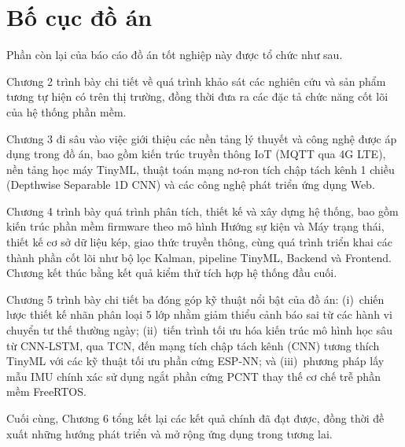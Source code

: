 \documentclass[../DoAn.tex]{subfiles}
\begin{document}
\section{Bố cục đồ án}
\label{section:1.4}
Phần còn lại của báo cáo đồ án tốt nghiệp này được tổ chức như sau.

Chương 2 trình bày chi tiết về quá trình khảo sát các nghiên cứu và sản phẩm tương tự hiện có trên thị trường, đồng thời đưa ra các đặc tả chức năng cốt lõi của hệ thống phần mềm.

Chương 3 đi sâu vào việc giới thiệu các nền tảng lý thuyết và công nghệ được áp dụng trong đồ án, bao gồm kiến trúc truyền thông IoT (MQTT qua 4G LTE), nền tảng học máy TinyML, thuật toán mạng nơ-ron tích chập tách kênh 1 chiều (Depthwise Separable 1D CNN) và các công nghệ phát triển ứng dụng Web.

Chương 4 trình bày quá trình phân tích, thiết kế và xây dựng hệ thống, bao gồm kiến trúc phần mềm firmware theo mô hình Hướng sự kiện và Máy trạng thái, thiết kế cơ sở dữ liệu kép, giao thức truyền thông, cùng quá trình triển khai các thành phần cốt lõi như bộ lọc Kalman, pipeline TinyML, Backend và Frontend. Chương kết thúc bằng kết quả kiểm thử tích hợp hệ thống đầu cuối.

Chương 5 trình bày chi tiết ba đóng góp kỹ thuật nổi bật của đồ án: (i)~chiến lược thiết kế nhãn phân loại 5 lớp nhằm giảm thiểu cảnh báo sai từ các hành vi chuyển tư thế thường ngày; (ii)~tiến trình tối ưu hóa kiến trúc mô hình học sâu từ CNN-LSTM, qua TCN, đến mạng tích chập tách kênh (CNN) tương thích TinyML với các kỹ thuật tối ưu phần cứng ESP-NN; và (iii)~phương pháp lấy mẫu IMU chính xác sử dụng ngắt phần cứng PCNT thay thế cơ chế trễ phần mềm FreeRTOS.

Cuối cùng, Chương 6 tổng kết lại các kết quả chính đã đạt được, đồng thời đề xuất những hướng phát triển và mở rộng ứng dụng trong tương lai.
\end{document}
